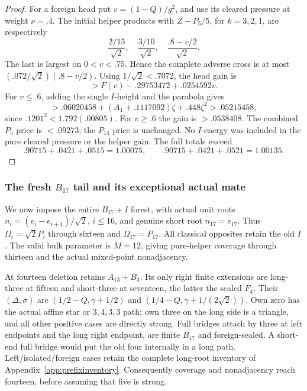 \documentclass[11pt]{article}
\theoremstyle{definition}
\theoremstyle{remark}
\begin{document}
\begin{proof}
For a foreign head put \(v=(1-Q)/g^2\), and use its cleared
pressure at weight \(\nu=.4\). The initial helper products with
\(Z-P_5/5\), for \(k=3,2,1\), are respectively
\[
 {\frac{2/15}{\sqrt2}},\quad {\frac{3/10}{\sqrt2}},\quad
 {\frac{.8-v/2}{\sqrt2}}.
\]
The last is largest on \(0<v<.75\). Hence the complete adverse
cross is at most \((.072/\sqrt2)(.8-v/2)\).
Using \(1/\sqrt2<.7072\), the head gain is
\[
 >F(v)-.29753472+.0254592v.
\]
For \(v\le.6\), adding the single \(I\)-height and the parabola gives
\[
 >.06020458+(A_1+.1117092)\zeta+.448\zeta^2
 >.05215458,
\]
since \(.1201^2<1.792(.00805)\).
For \(v\ge.6\) the gain is \(>.0538408\).
The combined \(P_5\) price is \(<.09273\); the \(P_{14}\) price
is unchanged. No \(I\)-energy was included in the pure cleared
pressure or the helper gain. The full totals exceed
\[
 .90715+.0421+.0515=1.00075,\qquad
 .90715+.0421+.0521=1.00135 .
\]
\end{proof}

\subsubsection[The fresh B17 tail and its exceptional actual mate]{The fresh \(B_{17}\) tail and its exceptional actual mate}
We now impose the entire \(B_{17}+I\) forest, with actual unit roots
\(n_i=(e_i-e_{i+1})/\sqrt2\), \(i\le16\), and genuine short
root \(n_{17}=e_{17}\). Thus
\(\Omega_i=\sqrt2P_i\) through sixteen and \(\Omega_{17}=P_{17}\).
All classical opposites retain the old \(I\).
The valid bulk parameter is \(M=12\), giving pure-helper coverage
through thirteen and the actual mixed-point nonadjacency.

At fourteen deletion retains \(A_{13}+B_3\).
Its only right finite extensions are long-three at fifteen and
short-three at seventeen, the latter the sealed \(F_4\).
Their \((\Delta,\sigma)\) are
\((1/2-Q,\gamma+1/2)\) and
\((1/4-Q,\gamma+1/(2\sqrt2))\).
Own zero has the actual affine star or \(3,4,3,3\) path;
own three on the long side is a triangle, and all other positive
cases are directly strong. Full bridges attach by three at left
endpoints and the long right endpoint, are finite \(B_{17}\) and
foreign-sealed. A short-end full bridge would put the old four
internally in a long path. Left/isolated/foreign cases retain the
complete long-root inventory of Appendix~\ref{app:prefixinventory}.
Consequently coverage and nonadjacency reach fourteen, before
assuming that five is strong.
\end{document}

